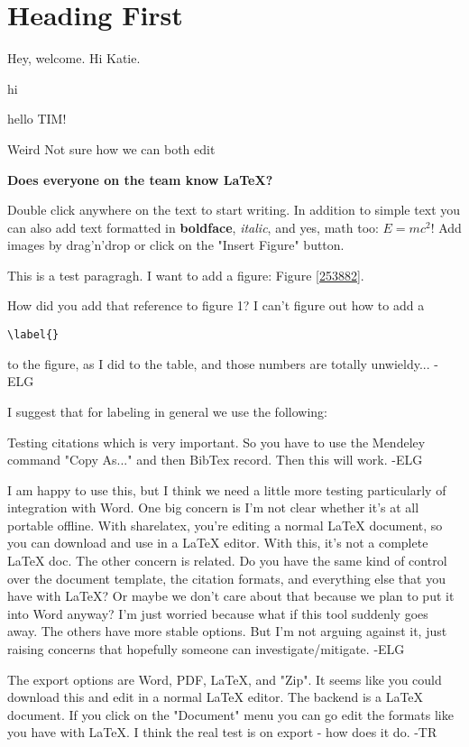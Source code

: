 \section{Heading First}
Hey, welcome. Hi Katie. 


hi

hello TIM! 

Weird Not sure how we can both edit

\textbf{Does everyone on the team know LaTeX?}


Double click anywhere on the text to start writing. In addition to simple text you can also add text formatted in \textbf{boldface}, \textit{italic}, and yes, math too: $E  =  mc^{2}$! Add images by drag'n'drop or click on the "Insert Figure" button. 

This is a test paragragh. I want to add a figure: Figure \ref{253882}.

How did you add that reference to figure 1? I can't figure out how to add a \begin{verbatim}\label{}\end{verbatim} to the figure, as I did to the table, and those numbers are totally unwieldy... -ELG

I suggest that for labeling in general we use the following:


Testing citations which is very important. \cite{Eisenhardt1989} So you have to use the Mendeley command "Copy As..." and then BibTex record. Then this will work. -ELG

I am happy to use this, but I think we need a little more testing particularly of integration with Word. One big concern is I'm not clear whether it's at all portable offline. With sharelatex, you're editing a normal LaTeX document, so you can download and use in a LaTeX editor. With this, it's not a complete LaTeX doc. The other concern is related. Do you have the same kind of control over the document template, the citation formats, and everything else that you have with LaTeX? Or maybe we don't care about that because we plan to put it into Word anyway? I'm just worried because what if this tool suddenly goes away. The others have more stable options. But I'm not arguing against it, just raising concerns that hopefully someone can investigate/mitigate. -ELG

The export options are Word, PDF, LaTeX, and "Zip". It seems like you could download this and edit in a normal LaTeX editor. The backend is a LaTeX document. If you click on the "Document" menu you can go edit the formats like you have with LaTeX. I think the real test is on export - how does it do. -TR
